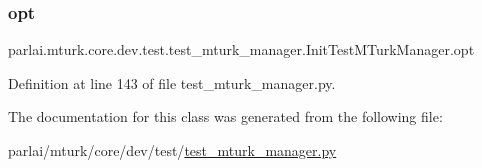 \subsubsection{\texorpdfstring{opt}{opt}}
{\footnotesize\ttfamily parlai.\+mturk.\+core.\+dev.\+test.\+test\+\_\+mturk\+\_\+manager.\+Init\+Test\+M\+Turk\+Manager.\+opt}



Definition at line 143 of file test\+\_\+mturk\+\_\+manager.\+py.



The documentation for this class was generated from the following file\+:\begin{DoxyCompactItemize}
\item 
parlai/mturk/core/dev/test/\hyperlink{dev_2test_2test__mturk__manager_8py}{test\+\_\+mturk\+\_\+manager.\+py}\end{DoxyCompactItemize}
